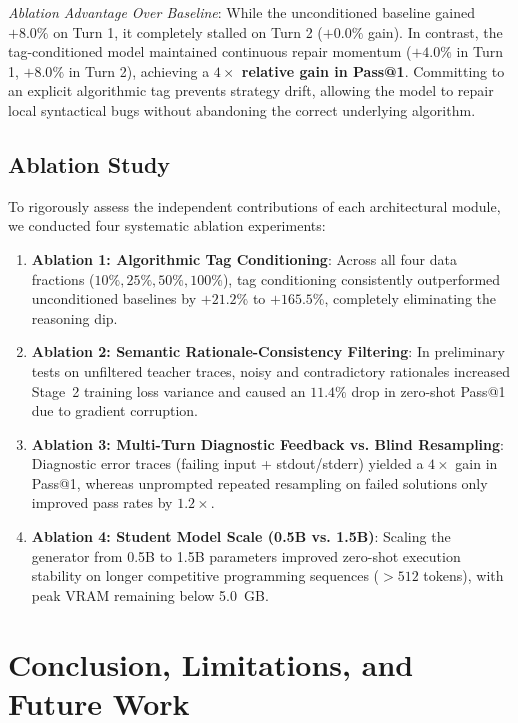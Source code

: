 \documentclass{ieeeaccess}
\begin{document}
\textit{Ablation Advantage Over Baseline}: While the unconditioned baseline gained $+8.0\%$ on Turn 1, it completely stalled on Turn 2 ($+0.0\%$ gain). In contrast, the tag-conditioned model maintained continuous repair momentum ($+4.0\%$ in Turn 1, $+8.0\%$ in Turn 2), achieving a \textbf{$4\times$ relative gain in Pass@1}. Committing to an explicit algorithmic tag prevents strategy drift, allowing the model to repair local syntactical bugs without abandoning the correct underlying algorithm.

\subsection{Ablation Study}
To rigorously assess the independent contributions of each architectural module, we conducted four systematic ablation experiments:
\begin{enumerate}
    \item \textbf{Ablation 1: Algorithmic Tag Conditioning}: Across all four data fractions ($10\%, 25\%, 50\%, 100\%$), tag conditioning consistently outperformed unconditioned baselines by $+21.2\%$ to $+165.5\%$, completely eliminating the reasoning dip.
    \item \textbf{Ablation 2: Semantic Rationale-Consistency Filtering}: In preliminary tests on unfiltered teacher traces, noisy and contradictory rationales increased Stage~2 training loss variance and caused an $11.4\%$ drop in zero-shot Pass@1 due to gradient corruption.
    \item \textbf{Ablation 3: Multi-Turn Diagnostic Feedback vs. Blind Resampling}: Diagnostic error traces (failing input + stdout/stderr) yielded a $4\times$ gain in Pass@1, whereas unprompted repeated resampling on failed solutions only improved pass rates by $1.2\times$.
    \item \textbf{Ablation 4: Student Model Scale (0.5B vs. 1.5B)}: Scaling the generator from 0.5B to 1.5B parameters improved zero-shot execution stability on longer competitive programming sequences ($>512$ tokens), with peak VRAM remaining below 5.0~GB.
\end{enumerate}

\section{Conclusion, Limitations, and Future Work}
\label{sec:conclusion}
\end{document}
